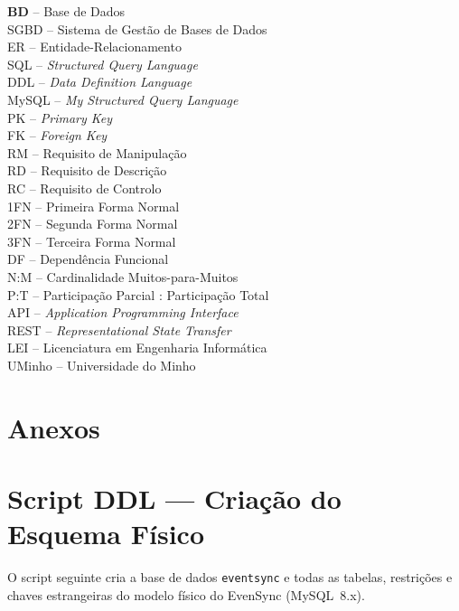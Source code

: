 \documentclass[runningheads]{llncs}
\begin{document}
\noindent
\textbf{BD} -- Base de Dados\\
SGBD -- Sistema de Gestão de Bases de Dados\\
ER -- Entidade-Relacionamento\\
SQL -- \textit{Structured Query Language}\\
DDL -- \textit{Data Definition Language}\\
MySQL -- \textit{My Structured Query Language}\\
PK -- \textit{Primary Key}\\
FK -- \textit{Foreign Key}\\
RM -- Requisito de Manipulação\\
RD -- Requisito de Descrição\\
RC -- Requisito de Controlo\\
1FN -- Primeira Forma Normal\\
2FN -- Segunda Forma Normal\\
3FN -- Terceira Forma Normal\\
DF -- Dependência Funcional\\
N:M -- Cardinalidade Muitos-para-Muitos\\
P:T -- Participação Parcial : Participação Total\\
API -- \textit{Application Programming Interface}\\
REST -- \textit{Representational State Transfer}\\
LEI -- Licenciatura em Engenharia Informática\\
UMinho -- Universidade do Minho

\newpage
\section{Anexos}

\appendix

\section{Script DDL --- Criação do Esquema Físico}
\label{apx:ddl}

O script seguinte cria a base de dados \texttt{eventsync} e todas as tabelas,
restrições e chaves estrangeiras do modelo físico do EvenSync (MySQL~8.x).
\end{document}
